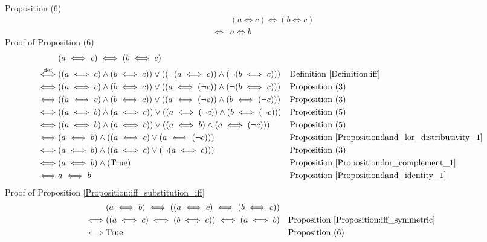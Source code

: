 \begin{prop}
\begin{align*}
\end{align*}
Proposition (6)
\begin{align*}
& (a \iff c) \iff (b \iff c) \\
\iff & a \iff b
\end{align*}
Proof of Proposition (6)
\begin{align*}
& (a \iff c) \iff (b \iff c) \\
\overset{\operatorname{def}}{\iff} & ((a \iff c) \land (b \iff c)) \lor ((\lnot (a \iff c)) \land (\lnot (b \iff c)))
& & \text{Definition \ref{Definition:iff}} \\
\iff & ((a \iff c) \land (b \iff c)) \lor ((a \iff (\lnot c)) \land (\lnot (b \iff c)))
& & \text{Proposition (3)} \\
\iff & ((a \iff c) \land (b \iff c)) \lor ((a \iff (\lnot c)) \land (b \iff (\lnot c)))
& & \text{Proposition (3)} \\
\iff & ((a \iff b) \land (a \iff c)) \lor ((a \iff (\lnot c)) \land (b \iff (\lnot c)))
& & \text{Proposition (5)} \\
\iff & ((a \iff b) \land (a \iff c)) \lor ((a \iff b) \land (a \iff (\lnot c)))
& & \text{Proposition (5)} \\
\iff & (a \iff b) \land ((a \iff c) \lor (a \iff (\lnot c)))
& & \text{Proposition \ref{Proposition:land_lor_distributivity_1}} \\
\iff & (a \iff b) \land ((a \iff c) \lor (\lnot (a \iff c)))
& & \text{Proposition (3)} \\
\iff & (a \iff b) \land (\text{True})
& & \text{Proposition \ref{Proposition:lor_complement_1}} \\
\iff & a \iff b
& & \text{Proposition \ref{Proposition:land_identity_1}} \\
\end{align*}
Proof of Proposition \ref{Proposition:iff_substitution_iff}
\begin{align*}
& (a \iff b) \iff ((a \iff c) \iff (b \iff c)) \\
\iff & ((a \iff c) \iff (b \iff c)) \iff (a \iff b)
& & \text{Proposition \ref{Proposition:iff_symmetric}} \\
\iff & \text{True}
& & \text{Proposition (6)} \\
\end{align*}
\end{prop}

